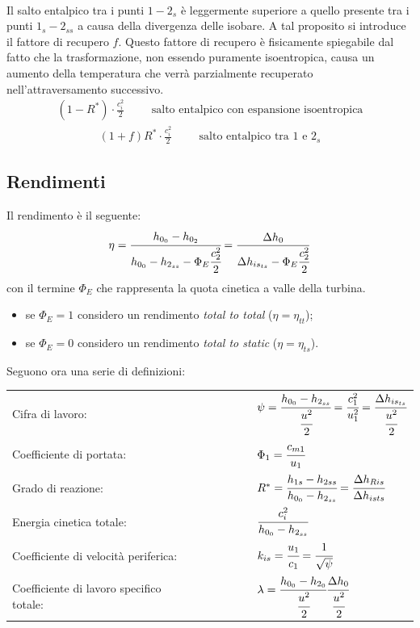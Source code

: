 \\Il salto entalpico tra i punti $1 - 2_s$ è leggermente superiore a quello presente tra i punti $1_s - 2_{ss}$ a causa della divergenza delle isobare. A tal proposito si introduce il fattore di recupero $f$. Questo fattore di recupero è fisicamente spiegabile dal fatto che la trasformazione, non essendo puramente isoentropica, causa un aumento della temperatura che verrà parzialmente recuperato nell'attraversamento successivo. 
\begin{align*}
(1- R^*) \cdot \frac{c_i^2}{2} \hspace{1cm} \mbox{salto entalpico con espansione isoentropica}
\end{align*}
\begin{align*}
(1+f)R^* \cdot \frac{c_i^2}{2} \hspace{1cm} \mbox{salto entalpico tra $1$ e $2_s$}
\end{align*}


\subsection{Rendimenti}
Il rendimento è il seguente:
\begin{align*}
\eta = \cfrac{h_{0_0} - h_{0_2}}{h_{0_0} - h_{2_{ss}} - \Phi_E \cfrac{c_2^2}{2}} = \frac{\Delta h_0}{\Delta h_{is_{ts}}-\Phi_E \cfrac{c_2^2}{2}}
\end{align*}
con il termine $\Phi_E$ che rappresenta la quota cinetica a valle della turbina. 
\begin{itemize}
	\item se $\Phi_E=1$ considero un rendimento \textit{total to total} ($\eta = \eta_{tt}$);
	\item se $\Phi_E=0$ considero un rendimento \textit{total to static} ($\eta = \eta_{ts}$).
\end{itemize}
Seguono ora una serie di definizioni:\\
\renewcommand\arraystretch{3}
\begin{tabular}{l l l l l l l}
	Cifra di lavoro: & & & & & &  $\psi = \cfrac{h_{0_0} - h_{2_{ss}}}{\cfrac{u^2}{2}} = \cfrac{c_1^2}{u_1^2} = \cfrac{\Delta h_{is_{ts}}}{\cfrac{u^2}{2}}$\\
	Coefficiente di portata: & & & & & & $\Phi_1 = \cfrac{c_{m1}}{u_1}$\\
	Grado di reazione: & & & & & & $R^* = \cfrac{h_{1s} - h_{2ss}}{h_{0_0} - h_{2_{ss}}} = \cfrac{\Delta h_{Ris}}{\Delta h_{ists}}$\\
	Energia cinetica totale: & & & & & & $\cfrac{c_i^2}{h_{0_0} - h_{2_{ss}}}$\\
	Coefficiente di velocità periferica: & & & & & & $k_{is} = \cfrac{u_1}{c_1} = \cfrac{1}{\sqrt{\psi}}$\\
	Coefficiente di lavoro specifico totale: & & & & & & $\lambda = \cfrac{h_{0_0} - h_{2_0}}{\cfrac{u^2}{2}} \cfrac{\Delta h_0}{\cfrac{u^2}{2}}$
\end{tabular}

